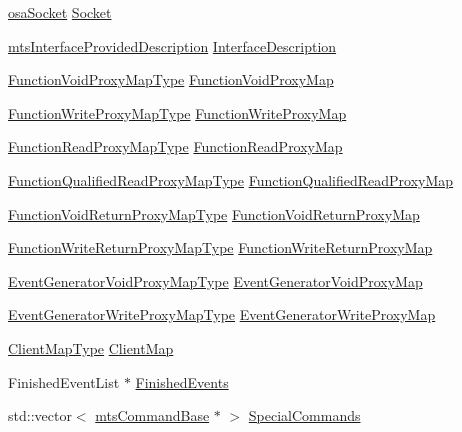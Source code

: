 \begin{DoxyCompactItemize}
\item 
\hyperlink{classosa_socket}{osa\+Socket} \hyperlink{classmts_socket_proxy_server_a8d1606419800ffe082caf5a6805dde19}{Socket}
\item 
\hyperlink{classmts_interface_provided_description}{mts\+Interface\+Provided\+Description} \hyperlink{classmts_socket_proxy_server_a2e2a6206e203ad931a69637b8dcecd4e}{Interface\+Description}
\item 
\hyperlink{classmts_socket_proxy_server_a6d95a7cca6e51f877454df35d3fa56ab}{Function\+Void\+Proxy\+Map\+Type} \hyperlink{classmts_socket_proxy_server_a6bd22e4fe18232c34b81f2b7bf4f81c3}{Function\+Void\+Proxy\+Map}
\item 
\hyperlink{classmts_socket_proxy_server_ae84115470284d069bbd2856f4fa11e43}{Function\+Write\+Proxy\+Map\+Type} \hyperlink{classmts_socket_proxy_server_a32e552baa11f56924b5877d67a65421c}{Function\+Write\+Proxy\+Map}
\item 
\hyperlink{classmts_socket_proxy_server_ac02122bd068b3dc59511a47e2e733671}{Function\+Read\+Proxy\+Map\+Type} \hyperlink{classmts_socket_proxy_server_a8e126ba85100a6153f7e244b1cdc226f}{Function\+Read\+Proxy\+Map}
\item 
\hyperlink{classmts_socket_proxy_server_ad42c455d343f85b06a2c7047739c9c7b}{Function\+Qualified\+Read\+Proxy\+Map\+Type} \hyperlink{classmts_socket_proxy_server_ab63d24a71f84275695f79461be04b118}{Function\+Qualified\+Read\+Proxy\+Map}
\item 
\hyperlink{classmts_socket_proxy_server_a542c0cd156add7e963c92287aaf4e7f3}{Function\+Void\+Return\+Proxy\+Map\+Type} \hyperlink{classmts_socket_proxy_server_a13c785afdf7affb3f63ff3eb45560c19}{Function\+Void\+Return\+Proxy\+Map}
\item 
\hyperlink{classmts_socket_proxy_server_ab8976dbfc7fa5afbb1f02e7cddc2d71d}{Function\+Write\+Return\+Proxy\+Map\+Type} \hyperlink{classmts_socket_proxy_server_a7628f02b88924954ecbe2c242acce5ba}{Function\+Write\+Return\+Proxy\+Map}
\item 
\hyperlink{classmts_socket_proxy_server_ae784ef6005901f988064e99f28bc4dc4}{Event\+Generator\+Void\+Proxy\+Map\+Type} \hyperlink{classmts_socket_proxy_server_a4a78412a050d8cfad01e7738cc96dee4}{Event\+Generator\+Void\+Proxy\+Map}
\item 
\hyperlink{classmts_socket_proxy_server_a54071862784d4a4b6b75588e5c03df14}{Event\+Generator\+Write\+Proxy\+Map\+Type} \hyperlink{classmts_socket_proxy_server_a8e4bb429d5685a620b5d1b9894092a1d}{Event\+Generator\+Write\+Proxy\+Map}
\item 
\hyperlink{classmts_socket_proxy_server_a7119b8c41d2a72f7234f77bdcc1e2fad}{Client\+Map\+Type} \hyperlink{classmts_socket_proxy_server_acb24d470395fe5cad656863434c0ef52}{Client\+Map}
\item 
Finished\+Event\+List $\ast$ \hyperlink{classmts_socket_proxy_server_a1907551b9d6dd7bcb7e46668686d29e1}{Finished\+Events}
\item 
std\+::vector$<$ \hyperlink{classmts_command_base}{mts\+Command\+Base} $\ast$ $>$ \hyperlink{classmts_socket_proxy_server_a033ddf4256700a5393055451d6f883a0}{Special\+Commands}
\end{DoxyCompactItemize}
